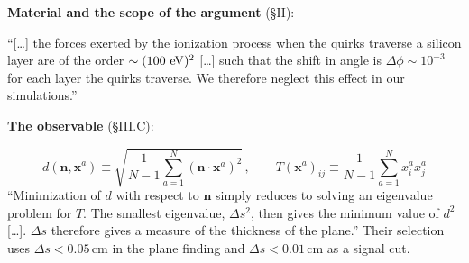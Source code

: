 \documentclass[11pt]{article}
\begin{document}
\noindent\textbf{Material and the scope of the argument} (\S II):
\begin{srcquote}
``[\dots] the forces exerted by the ionization process when the quirks traverse a silicon layer are of the order
$\sim(100\ {\rm eV})^2$ [\dots] such that the shift in angle is $\Delta\phi\sim10^{-3}$ for each layer the quirks traverse.
We therefore neglect this effect in our simulations.''
\end{srcquote}

\noindent\textbf{The observable} (\S III.C):
\begin{srcquote}
\[
  d(\mathbf n,\mathbf x^a)\equiv\sqrt{\frac{1}{N-1}\sum_{a=1}^N(\mathbf n\cdot\mathbf x^a)^2}\,,\qquad
  T(\mathbf x^a)_{ij}\equiv\frac{1}{N-1}\sum_{a=1}^Nx^a_ix^a_j \tag{Kn 10, 11}
\]
``Minimization of $d$ with respect to $\mathbf n$ simply reduces to solving an eigenvalue problem for $T$. The smallest
eigenvalue, $\Delta s^2$, then gives the minimum value of $d^2$ [\dots]. $\Delta s$ therefore gives a measure of the
thickness of the plane.'' Their selection uses $\Delta s<0.05$\,cm in the plane finding and $\Delta s<0.01$\,cm as a
signal cut.
\end{srcquote}
\end{document}
